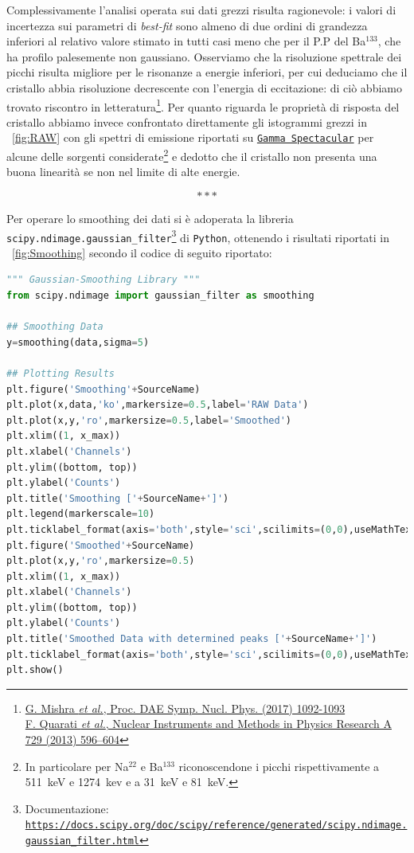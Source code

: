 \noindent Complessivamente l'analisi operata sui dati grezzi risulta ragionevole: i valori di incertezza sui parametri di \emph{best-fit} sono almeno di due ordini di grandezza inferiori al relativo valore stimato in tutti casi meno che per il P.P del Ba$^{133}$, che ha profilo palesemente non gaussiano. Osserviamo che la risoluzione spettrale dei picchi risulta migliore per le risonanze a energie inferiori, per cui deduciamo che il cristallo abbia risoluzione decrescente con l'energia di eccitazione: di ciò abbiamo trovato riscontro in letteratura\footnote{\href{http://www.sympnp.org/proceedings/62/G51.pdf}{G. Mishra \emph{et al.}, Proc. \!DAE Symp. \!\!Nucl. \!\!Phys. \! (2017) 1092-1093\\ \href{https://doi.org/10.1016/j.nima.2013.08.005}{F. Quarati \emph{et al.}, Nuclear Instruments and Methods in Physics Research A 729 (2013) 596–604}}}. Per quanto riguarda le proprietà di risposta del cristallo abbiamo invece confrontato direttamente gli istogrammi grezzi in \figurename~\ref{fig:RAW} con gli spettri di emissione riportati su \href{https://www.gammaspectacular.com}{\texttt{Gamma \!\!Spectacular}} per alcune delle sorgenti considerate\footnote{In particolare per Na$^{22}$ e Ba$^{133}$ riconoscendone i picchi rispettivamente a 511~keV e 1274~kev e a 31~keV e 81~keV.} e dedotto che il cristallo non presenta una buona linearità se non nel limite di alte energie.

\[* * * \] \smallskip

\noindent Per operare lo {smoothing} dei dati si è adoperata la libreria \texttt{scipy.ndimage.gaussian\_filter}\footnote{Documentazione: \href{https://docs.scipy.org/doc/scipy/reference/generated/scipy.ndimage.gaussian_filter.html}{\texttt{https://docs.scipy.org/doc/scipy/reference/generated/scipy.ndimage.gaussian\_filter.html}}} di \texttt{Python}, ottenendo i risultati riportati in \figurename~\ref{fig:Smoothing} secondo il codice di seguito riportato:

\vfill

\begin{lstlisting}[language=python, style=Pystyle, caption=\texttt{Python} code for Gaussian Smoothing Routine, label=list:Smoothing, 	captionpos=b]
""" Gaussian-Smoothing Library """
from scipy.ndimage import gaussian_filter as smoothing

## Smoothing Data
y=smoothing(data,sigma=5)

## Plotting Results
plt.figure('Smoothing'+SourceName)
plt.plot(x,data,'ko',markersize=0.5,label='RAW Data')
plt.plot(x,y,'ro',markersize=0.5,label='Smoothed')
plt.xlim((1, x_max))
plt.xlabel('Channels')
plt.ylim((bottom, top))
plt.ylabel('Counts')
plt.title('Smoothing ['+SourceName+']')
plt.legend(markerscale=10)
plt.ticklabel_format(axis='both',style='sci',scilimits=(0,0),useMathText=True)
plt.figure('Smoothed'+SourceName)
plt.plot(x,y,'ro',markersize=0.5)
plt.xlim((1, x_max))
plt.xlabel('Channels')
plt.ylim((bottom, top))
plt.ylabel('Counts')
plt.title('Smoothed Data with determined peaks ['+SourceName+']')
plt.ticklabel_format(axis='both',style='sci',scilimits=(0,0),useMathText=True)
plt.show()
\end{lstlisting}

